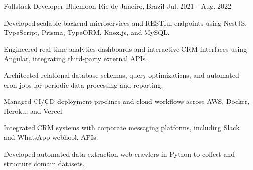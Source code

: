 \begin{cventries}
  \cventry
    {Fullstack Developer} %
    {Bluemoon} %
    {Rio de Janeiro, Brazil} %
    {Jul. 2021 - Aug. 2022} %
    {
      \begin{cvitems} %
        \item {Developed scalable backend microservices and RESTful endpoints using NestJS, TypeScript, Prisma, TypeORM, Knex.js, and MySQL.}
        \item {Engineered real-time analytics dashboards and interactive CRM interfaces using Angular, integrating third-party external APIs.}
        \item {Architected relational database schemas, query optimizations, and automated cron jobs for periodic data processing and reporting.}
        \item {Managed CI/CD deployment pipelines and cloud workflows across AWS, Docker, Heroku, and Vercel.}
        \item {Integrated CRM systems with corporate messaging platforms, including Slack and WhatsApp webhook APIs.}
        \item {Developed automated data extraction web crawlers in Python to collect and structure domain datasets.}
      \end{cvitems}
    }

\end{cventries}

\newpage


